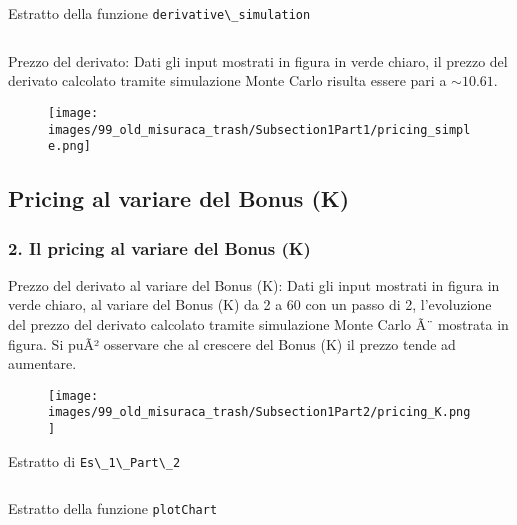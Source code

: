 \begin{frame}{Estratto della funzione \color{black}\Verb+derivative\_simulation+}
	\inputminted[fontsize=\tiny]{vb.net}{images/99_old_misuraca_trash/assets/derivative_simulation1.txt}
\end{frame}



\begin{frame}
	\begin{block}{Prezzo del derivato:}
		Dati gli input mostrati in figura in verde chiaro, il prezzo del derivato calcolato tramite simulazione Monte Carlo risulta essere pari a $\mathbf{\sim10.61}$\textbf{\textcurrency}.
	\end{block}
	 
	\begin{figure}[!htbp]
		\centering
		\texttt{[image: images/99\_old\_misuraca\_trash/Subsection1Part1/pricing\_simple.png]}
	\end{figure}
\end{frame}

\subsection[Pricing al variare del Bonus (K)]{Pricing al variare del Bonus (K)}
\begin{frame}
	\frametitle{2. Il pricing al variare del Bonus (K)}
	\begin{block}{Prezzo del derivato al variare del Bonus (K):}
		Dati gli input mostrati in figura in verde chiaro, al variare del Bonus (K) da 2 a 60 con un passo di 2, l'evoluzione del prezzo del derivato calcolato tramite simulazione Monte Carlo Ã¨ mostrata in figura.
		Si puÃ² osservare che al crescere del Bonus (K) il prezzo tende ad aumentare.
	\end{block}
	
	\begin{figure}[!htbp]
		\centering
		\texttt{[image: images/99\_old\_misuraca\_trash/Subsection1Part2/pricing\_K.png]}
	\end{figure}
\end{frame}

\begin{frame}{Estratto di \color{black}\Verb+Es\_1\_Part\_2+}
	\inputminted[fontsize=\tiny]{vb.net}{images/99_old_misuraca_trash/assets/part2.txt}
\end{frame} 

\begin{frame}{Estratto della funzione \color{black}\Verb+plotChart+}
	\inputminted[fontsize=\tiny]{vb.net}{images/99_old_misuraca_trash/assets/plotChart.txt}
\end{frame}
 
